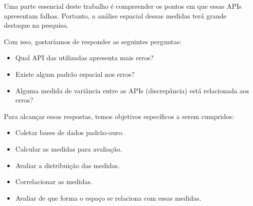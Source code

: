 Uma parte essencial deste trabalho é compreender os pontos em que essas APIs apresentam falhas. Portanto, a análise espacial dessas medidas terá grande destaque na pesquisa.

Com isso, gostaríamos de responder as seguintes perguntas:
\begin{itemize}
   \item Qual API das utilizadas apresenta mais erros?
   \item Existe algum padrão espacial nos erros?
   \item Alguma medida de variância entre as APIs (discrepância) está relacionada aos erros?
\end{itemize}

Para alcançar essas respostas, temos objetivos específicos a serem cumpridos:

\begin{itemize}
   \item Coletar bases de dados padrão-ouro.
   \item Calcular as medidas para avaliação.
   \item Avaliar a distribuição das medidas.
   \item Correlacionar as medidas.
   \item Avaliar de que forma o espaço se relaciona com essas medidas.
\end{itemize}






